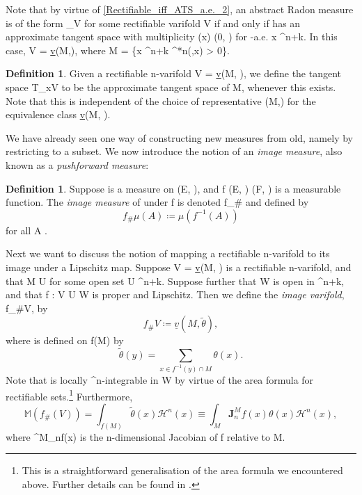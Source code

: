 \documentclass[a4paper, 11pt]{article}
\theoremstyle{plain}
\theoremstyle{definition}
\newtheorem{definition}[theorem]{Definition}
\theoremstyle{remark}
\numberwithin{equation}{subsection}
\def\({}
\def\){}
\begin{document}
Note that by virtue of \cref{Rectifiable_iff_ATS_a.e._2}, an abstract Radon measure \(\mu\) is of the form \(\mu_V\) for some rectifiable varifold \(V\) if and only if \(\mu\) has an approximate tangent space with multiplicity \(\theta(x) \in (0, \infty)\) for \(\mu\)-a.e. \(x \in {}^{n+k}\). In this case, \(V = \underline{v}(M,\theta)\), where \(M = \{x \in {}^{n+k} \vcentcolon \Theta^{*n}(\mu,x) > 0\}\).

\begin{definition}
Given a rectifiable \(n\)-varifold \(V = \underline{v}(M, \theta)\), we define the tangent space \(T_{x}V\) to be the approximate tangent space of \(M\), whenever this exists. Note that this is independent of the choice of representative \((M,\theta)\) for the equivalence class \(\underline{v}(M, \theta)\).
\end{definition}

We have already seen one way of constructing new measures from old, namely by restricting to a subset. We now introduce the notion of an \emph{image measure}, also known as a \emph{pushforward measure}:

\begin{definition}
Suppose \(\mu\) is a measure on \((E, )\), and \(f \vcentcolon (E, ) \rightarrow (F, )\) is a measurable function. The \emph{image measure} of \(\mu\) under \(f\) is denoted \(f_{\#}\mu\) and defined by
\begin{equation}
f_{\#}\mu(A) \coloneq \mu(f^{-1}(A))
\end{equation}
for all \(A \in {}\).
\end{definition} 



Next we want to discuss the notion of mapping a rectifiable \(n\)-varifold to its image under a Lipschitz map. Suppose \(V = \underline{v}(M, \theta)\) is a rectifiable \(n\)-varifold, and that \(M \subset U\) for some open set \(U \subset {}^{n+k}\). Suppose further that \(W\) is open in \(^{n+k}\), and that \(f :  V \cap U \rightarrow W\) is proper and Lipschitz. Then we define the \emph{image varifold}, \(f_{\#}V\), by
\begin{equation}
f_{\#}V \coloneq \underline{v}(M, \tilde{\theta}),
\end{equation}
where \(\tilde{\theta}\) is defined on \(f(M)\) by
\begin{equation}
\tilde{\theta}(y) = \sum_{x \in f^{-1}(y) \cap M}\theta(x).
\end{equation}
Note that \(\tilde{\theta}\) is locally \(^{n}\)-integrable in \(W\) by virtue of the area formula for rectifiable sets.\footnote{This is a straightforward generalisation of the area formula we encountered above. Further details can be found in \cite[Section 3.3]{Rin22}.} Furthermore,
\begin{equation}
\mathbb{M}(f_{\#}(V)) = \int_{f(M)}\tilde{\theta}(x)\mathcal{H}^{n}(x) \equiv \int_{M} \mathbf{J}^{M}_{n}f(x)\theta(x)\mathcal{H}^{n}(x),
\end{equation}
where \(^{M}_{n}f(x)\) is the \(n\)-dimensional Jacobian of \(f\) relative to \(M\).
\end{document}
